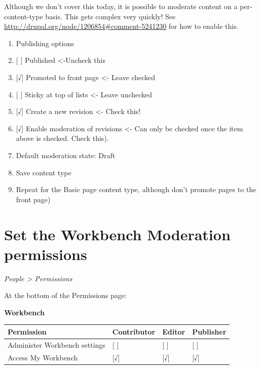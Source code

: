 \documentclass[letterpaper,10pt,english]{sphinxmanual}
\begin{document}
Although we don't cover this today, it is possible to moderate content on a per-content-type basis. This gets complex very quickly! See \href{http://drupal.org/node/1206854\#comment-5241230}{http://drupal.org/node/1206854\#comment-5241230} for how to enable this.
\begin{enumerate}
\item {} 
Publishing options

\item {} 
{[} {]} Published \textless{}-Uncheck this

\item {} 
{[}√{]} Promoted to front page \textless{}- Leave checked

\item {} 
{[} {]} Sticky at top of lists \textless{}- Leave unchecked

\item {} 
{[}√{]} Create a new revision \textless{}- Check this!

\item {} 
{[}√{]} Enable moderation of revisions \textless{}- Can only be checked once the item above is checked. Check this).

\item {} 
Default moderation state: Draft

\item {} 
Save content type

\item {} 
Repeat for the Basic page content type, although don't promote pages to the front page)

\end{enumerate}


\section{Set the Workbench Moderation permissions}
\label{moderation:set-the-workbench-moderation-permissions}
\emph{People \textgreater{} Permissions}

At the bottom of the Permissions page:

\textbf{Workbench}

\begin{tabulary}{\linewidth}{|L|L|L|L|}
\hline
\textbf{
Permission
} & \textbf{
Contributor
} & \textbf{
Editor
} & \textbf{
Publisher
}\\\hline

Administer Workbench settings
 & 
{[} {]}
 & 
{[} {]}
 & 
{[} {]}
\\\hline

Access My Workbench
 & 
{[}√{]}
 & 
{[}√{]}
 & 
{[}√{]}
\\\hline
\end{tabulary}
\end{document}
